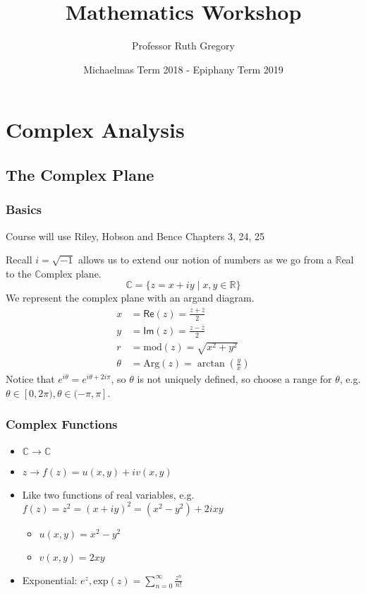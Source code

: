 \documentclass[a4paper, 11pt, normalem]{report}
\title{Mathematics Workshop \vspace{-20pt}}
\author{Professor Ruth Gregory}
\date{\vspace{-15pt}Michaelmas Term 2018 - Epiphany Term 2019}
\newcommand\R{\mathbb{R}}
\newcommand\C{\mathbb{C}}
\newcommand\Rl{\mathsf{Re}}
\newcommand\Iy{\mathsf{Im}}
\begin{document}
\maketitle
\tableofcontents

\part{Complex Analysis}
\chapter{The Complex Plane}
\section{Basics}
Course will use Riley, Hobson and Bence Chapters 3, 24, 25

Recall $i = \sqrt{-1}$ allows us to extend our notion of numbers as we go from a $\R$eal to the $\C$omplex plane.
\begin{equation}
    \C = \{z = x + iy\;|\;x,y \in \R\}
\end{equation}
We represent the complex plane with an argand diagram.
\begin{align}
    x &= \Rl(z) = \frac{z + \bar{z}}{2} \\
    y &= \Iy(z) = \frac{z - \bar{z}}{2} \\
    r &= \mathrm{mod}(z) = \sqrt{x^2 + y^2} \\
    \theta &= \mathrm{Arg}(z) = \arctan\left(\frac{y}{x}\right)
\end{align}
Notice that $e^{i\theta} = e^{i\theta + 2i\pi}$, so $\theta$ is not uniquely defined, so choose a range for $\theta$, e.g. $\theta \in [0, 2\pi), \theta \in (-\pi,\pi]$.

\section{Complex Functions}
\begin{itemize}
    \item $\C \to \C$
    \item $z \to f(z) = u(x,y) + iv(x,y)$
    \item Like two functions of real variables, e.g. $f(z) = z^2 = (x + iy)^2 = (x^2 - y^2) + 2ixy$
    \begin{itemize}
        \item $u(x,y) = x^2 - y^2$
        \item $v(x,y) = 2xy$
    \end{itemize}
\item Exponential: $e^z, \mathrm{exp}(z) = \sum_{n=0}^{\infty} \frac{z^n}{n!}$
\end{itemize}
\end{document}
